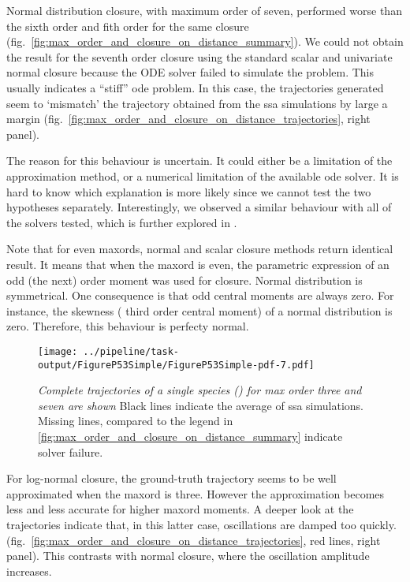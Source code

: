 Normal distribution closure, with maximum order of seven, performed worse than the sixth order and fith order for the same closure (fig.~\autoref{fig:max_order_and_closure_on_distance_summary}).
We could not obtain the result for the seventh order closure using the standard scalar and univariate normal closure
because the ODE solver failed to simulate the problem.
This usually indicates a ``stiff'' \gls{ode} problem.
In this case, the trajectories generated seem to `mismatch' the trajectory obtained from the \gls{ssa} simulations by
large a margin (fig.~\autoref{fig:max_order_and_closure_on_distance_trajectories}, right panel).

The reason for this behaviour is uncertain. It could either be a limitation of the approximation method, or a numerical limitation of the available \gls{ode} solver.
It is hard to know which explanation is more likely since we cannot test the two hypotheses separately.
Interestingly, we observed a similar behaviour with all of the solvers tested, which is further explored in .

Note that for even \glspl{maxord}, normal and scalar closure methods return identical result.
It means that when the \gls{maxord} is even,  the parametric expression of an odd (the next) order moment was used for closure.
Normal distribution is symmetrical. One consequence is that odd central moments are always zero.
For instance, the skewness (\ie{} third order central moment) of a normal distribution is zero.
Therefore, this behaviour is perfecty normal.



\begin{figure}
    \centering
    \texttt{[image: ../pipeline/task-output/FigureP53Simple/FigureP53Simple-pdf-7.pdf]}
    \caption{\emph{Complete trajectories of a single species (\pft) for max order three and seven are shown} 
    Black lines indicate the average of \gls{ssa} simulations. 
    Missing lines, compared to the legend in \autoref{fig:max_order_and_closure_on_distance_summary} indicate solver failure.}
    \label{fig:max_order_and_closure_on_distance_trajectories}
\end{figure}

 
For log-normal closure, the ground-truth trajectory seems to be well approximated when the \gls{maxord} is three.
However the approximation becomes less and less accurate for higher \gls{maxord} moments.
A deeper look at the trajectories indicate that, in this latter case,
oscillations are damped too quickly. (fig.~\autoref{fig:max_order_and_closure_on_distance_trajectories}, red lines, right panel).
This contrasts with normal closure, where the oscillation amplitude increases.

